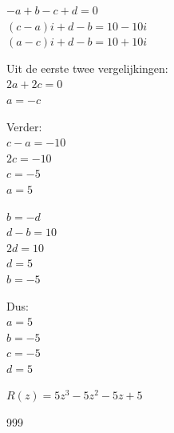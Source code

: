 \documentclass[a4paper]{article}
\begin{document}
$-a+b-c+d=0$ \\

$(c-a)i+d-b=10-10i$ \\

$(a-c)i+d-b=10+10i$ \\

\medskip

Uit de eerste twee vergelijkingen: \\

$2a+2c=0$ \\

$a=-c$ \\

\medskip

Verder: \\

$c-a=-10$ \\

$2c=-10$ \\

$c=-5$ \\

$a=5$ \\

\medskip

$b=-d$ \\

$d-b=10$ \\

$2d=10$ \\

$d=5$ \\

$b=-5$ \\

\medskip

Dus: \\

$a=5$ \\

$b=-5$ \\

$c=-5$ \\

$d=5$ \\

\medskip

$R(z)=5z^3-5z^2-5z+5$ \\

\begin{thebibliography}{999}
\end{thebibliography}
\end{document}
